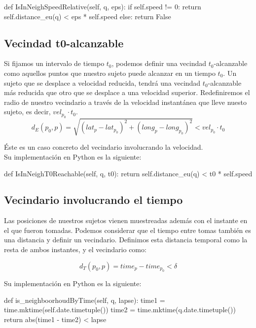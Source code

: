 \documentclass[a4paper, 12pt, spanish]{article}
\begin{document}
\begin{python}
        def IsInNeighSpeedRelative(self, q, eps):
			if self.speed != 0:
				return self.distance_eu(q) < eps * self.speed	
			else:
				return False
\end{python}


\subsection{Vecindad t0-alcanzable}

Si fijamos un intervalo de tiempo $t_0$, podemos definir una vecindad $t_0$-alcanzable como aquellos puntos que nuestro sujeto puede alcanzar en un tiempo $t_0$. Un sujeto que se desplace a velocidad reducida, tendr\'a una vecindad $t_0$-alcanzable m\'as reducida que otro que se desplace a una velocidad superior. Redefiniremos el radio de nuestro vecindario a trav\'es de la velocidad instant\'anea que lleve nuesto sujeto, es decir, $vel_{p_0}\cdot t_0$.  \\

$$ d_E(p_0, p) = \sqrt{(lat_{p} - lat_{p_0})^2 + (long_{p} - long_{p_0})^2 } < vel_{p_0} \cdot t_0 $$

\'Este es un caso concreto del vecindario involucrando la velocidad. \\


Su implementaci\'on en Python es la siguiente:\\

\begin{python}
        def IsInNeighT0Reachable(self, q, t0):
                return self.distance_eu(q) < t0 * self.speed
\end{python}

\subsection{Vecindario involucrando el tiempo}

Las posiciones de nuestros sujetos vienen muestreadas adem\'as con el instante en el que fueron tomadas. Podemos considerar que el tiempo entre tomas tambi\'en es una distancia y definir un vecindario. Definimos esta distancia temporal como la resta de ambos instantes, y el vecindario como: 

$$ d_T(p_0, p) = time_p - time_{p_0} < \delta $$

Su implementaci\'on en Python es la siguiente:\\

\begin{python}
	def is_neighboorhoudByTime(self, q, lapse):
		time1 = time.mktime(self.date.timetuple())
		time2 = time.mktime(q.date.timetuple())
		return abs(time1 - time2) < lapse
\end{python}
\end{document}
